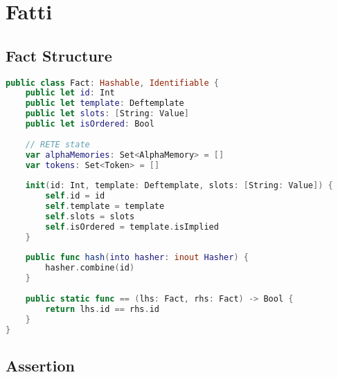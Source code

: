 \section{Fatti}

\subsection{Fact Structure}

\begin{lstlisting}[language=Swift]
public class Fact: Hashable, Identifiable {
    public let id: Int
    public let template: Deftemplate
    public let slots: [String: Value]
    public let isOrdered: Bool
    
    // RETE state
    var alphaMemories: Set<AlphaMemory> = []
    var tokens: Set<Token> = []
    
    init(id: Int, template: Deftemplate, slots: [String: Value]) {
        self.id = id
        self.template = template
        self.slots = slots
        self.isOrdered = template.isImplied
    }
    
    public func hash(into hasher: inout Hasher) {
        hasher.combine(id)
    }
    
    public static func == (lhs: Fact, rhs: Fact) -> Bool {
        return lhs.id == rhs.id
    }
}
\end{lstlisting}

\subsection{Assertion}

